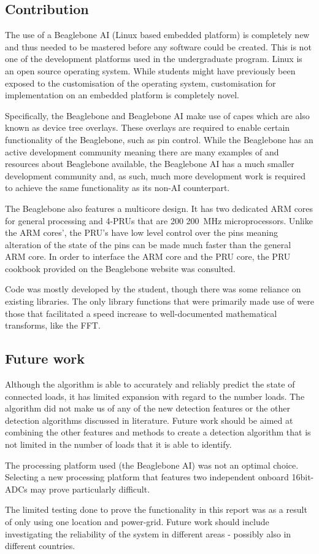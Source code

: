 \subsection{Contribution}
The use of a Beaglebone AI (Linux based embedded platform) is completely new and thus needed to be mastered before any software could be created. This is not one of the development platforms used in the undergraduate program. Linux is an open source operating system. While students might have previously been exposed to the customisation of the operating system, customisation for implementation on an embedded platform is completely novel.
\par
Specifically, the Beaglebone and Beaglebone AI make use of capes which are also known as device tree overlays. These overlays are required to enable certain functionality of the Beaglebone, such as pin control. While the Beaglebone has an active development community meaning there are many examples of and resources about Beaglebone available, the Beaglebone AI has a much smaller development community and, as such, much more development work is required to achieve the same functionality as its non-AI counterpart.
\par
The Beaglebone also features a multicore design. It has two dedicated ARM cores for general processing and 4-PRUs that are 200 \qty{200}{\MHz} microprocessors. Unlike the ARM cores', the PRU's have low level control over the pins meaning alteration of the state of the pins can be made much faster than the general ARM core. In order to interface the ARM core and the PRU core, the PRU cookbook provided on the Beaglebone website was consulted.  
\par 
Code was mostly developed by the student, though there was some reliance on existing libraries. The only library functions that were primarily made use of were those that facilitated a speed increase to well-documented mathematical transforms, like the FFT. 

\subsection{Future work}
Although the algorithm is able to accurately and reliably predict the state of connected loads, it has limited expansion with regard to the number loads. The algorithm did not make us of any of the new detection features or the other detection algorithms discussed in literature. Future work should be aimed at combining the other features and methods to create a detection algorithm that is not limited in the number of loads that it is able to identify.
\par
The processing platform used (the Beaglebone AI) was not an optimal choice. Selecting a new processing platform that features two independent onboard 16bit-ADCs may prove particularly difficult.
\par
The limited testing done to prove the functionality in this report was as a result of only using one location and power-grid. Future work should include investigating the reliability of the system in different areas - possibly also in different countries.  

\newpage



